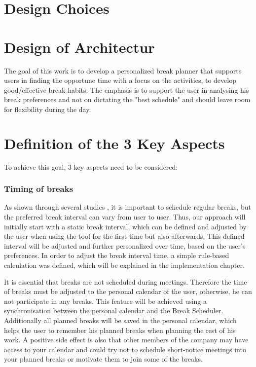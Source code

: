 \documentclass{hasel_thesis}
\begin{document}
\section{Design Choices}
\section{Design of Architectur}
The goal of this work is to develop a personalized break planner that supports users in finding the opportune time with a focus on the activities, to develop good/effective break habits. The emphasis is to support the user in analysing his break preferences and not on dictating the "best schedule" and should leave room for flexibility during the day.

\section{Definition of the 3 Key Aspects}
To achieve this goal, 3 key aspects need to be considered:

\subsubsection{Timing of breaks}
As shown through several studies \cite{Largo-Wight.2017} \cite{KimS.ParkY.&Niu.2017}, it is important to schedule regular breaks, but the preferred break interval can vary from user to user. Thus, our approach will initially start with a static break interval, which can be defined and adjusted by the user when using the tool for the first time but also afterwards. This defined interval will be adjusted and further personalized over time, based on the user's preferences. In order to adjust the break interval time, a simple rule-based calculation was defined, which will be explained in the implementation chapter.

It is essential that breaks are not scheduled during meetings. Therefore the time of breaks must be adjusted to the personal calendar of the user, otherwise, he can not participate in any breaks. This feature will be achieved using a synchronisation between the personal calendar and the Break Scheduler. Additionally all planned breaks will be saved in the personal calendar, which helps the user to remember his planned breaks when planning the rest of his work. A positive side effect is also that other members of the company may have access to your calendar and could try not to schedule short-notice meetings into your planned breaks or motivate them to join some of the breaks.
\end{document}
